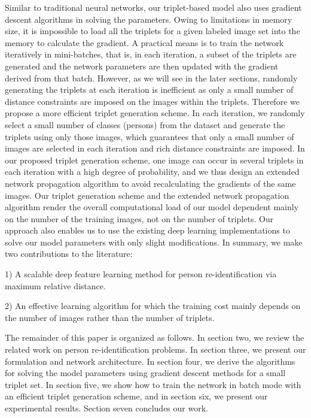 \documentclass[review]{elsarticle}
\begin{document}
Similar to traditional neural networks, our triplet-based model also uses gradient descent algorithms in solving the parameters. Owing to limitations in memory size, it is impossible to load all the triplets for a given labeled image set into the memory to calculate the gradient. A practical means is to train the network iteratively in mini-batches, that is, in each iteration, a subset of the triplets are generated and the network parameters are then updated with the gradient derived from that batch. However, as we will see in the later sections, randomly generating the triplets at each iteration is inefficient as only a small number of distance constraints are imposed on the images within the triplets. Therefore we propose a more efficient triplet generation scheme. In each iteration, we randomly select a small number of classes (persons) from the dataset and generate the triplets using only those images, which guarantees that only a small number of images are selected in each iteration and rich distance constraints are imposed. In our proposed triplet generation scheme, one image can occur in several triplets in each iteration with a high degree of probability, and we thus design an extended network propagation algorithm to avoid recalculating the gradients of the same images. Our triplet generation scheme and the extended network propagation algorithm render the overall computational load of our model dependent mainly on the number of the training images, not on the number of triplets. Our approach also enables us to use the existing deep learning implementations to solve our model parameters with only slight modifications. In summary, we make two contributions to the literature:

1) A scalable deep feature learning method for person re-identification via maximum relative distance.

2) An effective learning algorithm for which the training cost mainly depends on the number of images rather than the number of triplets.


The remainder of this paper is organized as follows. In section two, we review the related work on person re-identification problems. In section three, we present our formulation and network architecture. In section four, we derive the algorithms for solving the model parameters using gradient descent methods for a small triplet set.  In section five, we show how to train the network in batch mode with an efficient triplet generation scheme, and in section six, we present our experimental results. Section seven concludes our work.
\end{document}
